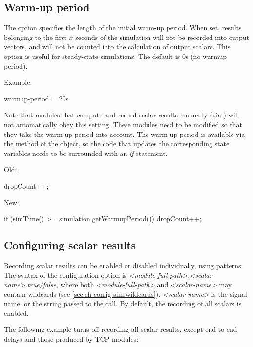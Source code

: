 \subsection{Warm-up period}

The  option specifies the length of the initial
warm-up period. When set, results belonging to the first $x$ seconds
of the simulation will not be recorded into output vectors, and will
not be counted into the calculation of output scalars.
This option is useful for steady-state simulations. The default is 0s
(no warmup period).

Example:

\begin{inifile}
warmup-period = 20s
\end{inifile}

Note that modules that compute and record scalar results manually
(via ) will not automatically obey this setting.
These modules need to be modified so that they take the warm-up period
into account. The warm-up period is available via the
 method of the  object,
so the code that updates the corresponding state variables needs
to be surrounded with an \textit{if} statement.

Old:

\begin{cpp}
dropCount++;
\end{cpp}

New:

\begin{cpp}
if (simTime() >= simulation.getWarmupPeriod())
    dropCount++;
\end{cpp}


\subsection{Configuring scalar results}

Recording scalar results can be enabled or disabled individually, using
patterns. The syntax of the configuration option is
\textit{<module-full-path>.<scalar-name>.}\textit{true/false},
where both \textit{<module-full-path>} and \textit{<scalar-name>}
may contain wildcards (see \ref{sec:ch-config-sim:wildcards}).
\textit{<scalar-name>} is the signal name, or the string passed to the
 call. By default, the recording of all scalars is
enabled.

The following example turns off recording all scalar results, except
end-to-end delays and those produced by TCP modules:

